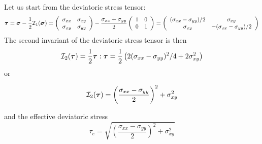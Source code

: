 Let us start from the deviatoric stress tensor:
\[
\bm\tau
=
\bm\sigma - \frac12 {\cal I}_1(\bm\sigma)
=
\left(\begin{array}{cc}
\sigma_{xx} & \sigma_{xy} \\ 
\sigma_{xy} & \sigma_{yy} 
\end{array}\right)
-\frac{\sigma_{xx}+\sigma_{yy}}{2} 
\left(\begin{array}{cc}
1 & 0 \\ 0 & 1
\end{array}\right)
=
\left(
\begin{array}{cc}
(\sigma_{xx}-\sigma_{yy})/2 & \sigma_{xy} \\
\sigma_{xy} & -(\sigma_{xx}-\sigma_{yy})/2
\end{array}
\right)
\]
The second invariant of the deviatoric stress tensor is then 
\[
{\cal I}_2(\bm\tau) = \frac12 \bm\tau:\bm\tau
= \frac12 \left( 2 (\sigma_{xx}-\sigma_{yy})^2/4 + 2 \sigma_{xy}^2 \right)
\]
or
\begin{mdframed}[backgroundcolor=blue!5]
\[
{\cal I}_2(\bm\tau) 
= \left(\frac{\sigma_{xx}-\sigma_{yy}}{2} \right)^2 + \sigma_{xy}^2
\]
\end{mdframed}


and the effective deviatoric stress
\[
\tau_e = 
\sqrt{\left(\frac{\sigma_{xx}-\sigma_{yy}}{2} \right)^2 + \sigma_{xy}^2}
\]


